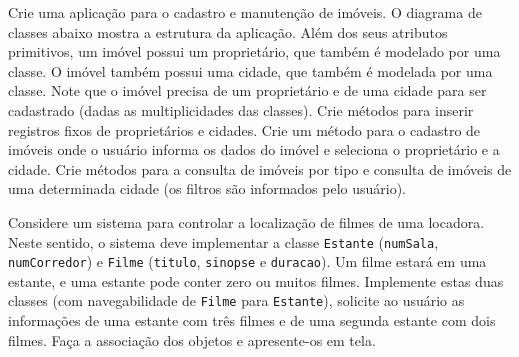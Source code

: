 \begin{exercise}[Imobiliaria]
Crie uma aplicação para o cadastro e manutenção de imóveis. O diagrama de classes abaixo mostra a estrutura da aplicação. Além dos seus atributos primitivos, um imóvel possui um proprietário, que também é modelado por uma classe. O imóvel também possui uma cidade, que também é modelada por uma classe. Note que o imóvel precisa de um proprietário e de uma cidade para ser cadastrado (dadas as multiplicidades das classes). Crie métodos para inserir registros fixos de proprietários e cidades. Crie um método para o cadastro de imóveis onde o usuário informa os dados do imóvel e seleciona o proprietário e a cidade. Crie métodos para a consulta de imóveis por tipo e consulta de imóveis de uma determinada cidade (os filtros são informados pelo usuário).

\begin{figure}[h]
	\centering
\end{figure}
\end{exercise}

\begin{exercise}[Filmes]
Considere um sistema para controlar a localização de filmes de uma locadora. Neste sentido, o sistema deve implementar a classe \texttt{Estante} (\texttt{numSala}, \texttt{numCorredor}) e \texttt{Filme} (\texttt{titulo}, \texttt{sinopse} e \texttt{duracao}). Um filme estará em uma estante, e uma estante pode conter zero ou muitos filmes. Implemente estas duas classes (com navegabilidade de \texttt{Filme} para \texttt{Estante}), solicite ao usuário as informações de uma estante com três filmes e de uma segunda estante com dois filmes. Faça a associação dos objetos e apresente-os em tela.
\end{exercise}

